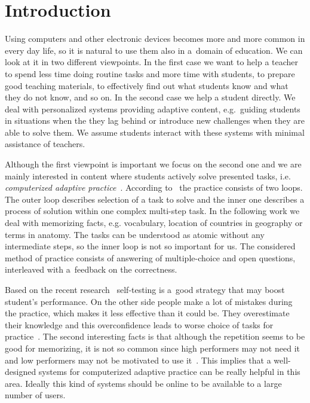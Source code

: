 \documentclass[table,color,cover,twoside,nolot,nolof]{fithesis3/fithesis3}
\begin{document}
\chapter{Introduction}

Using computers and other electronic devices becomes more and mo\-re common in
every day life, so it is natural to use them also in a~domain of education. We
can look at it in two different viewpoints. In the first case we want to help
a teacher to spend less time doing routine tasks and more time with students,
to prepare good teaching materials, to effectively find out what students
know and what they do not know, and so on. In the second case we help
a student directly. We deal with personalized systems providing adaptive
content, e.g.~guiding students in situations when the they lag behind
or introduce new challenges when they are able to solve them. We assume
students interact with these systems with minimal assistance of teachers.

Although the first viewpoint is important we focus on the second one and we are
mainly interested in content where students actively solve presented tasks,
i.e. \emph{computerized adaptive practice}~\cite{klinkenberg2011computer}.
According to~\cite{vanlehn2006behavior} the practice consists of two loops. The
outer loop describes selection of a task to solve and the inner one
describes a process of solution within one complex multi-step task. In the
following work we deal with memorizing facts, e.g. vocabulary, location of
countries in geography or terms in anatomy. The tasks can be understood as
atomic without any intermediate steps, so the inner loop is not so important
for us. The considered method of practice consists of answering of
multiple-choice and open questions, interleaved with a~feedback on the
correctness.

Based on the recent research~\cite{bjork2013self} self-testing is a~good
strategy that may boost student's performance. On the other side people make
a lot of mistakes during the practice, which makes it less effective than it
could be. They overestimate their knowledge and this overconfidence leads to
worse choice of tasks for practice~\cite{bjork2013self,kornell2008optimising}.
The second interesting facts is that although the repetition seems to be good
for memorizing, it is not so common since high performers may not need it and
low performers may not be motivated to use it~\cite{bjork2013self}. This
implies that a well-designed systems for computerized adaptive practice can be
really helpful in this area. Ideally this kind of systems should be online to
be available to a large number of users.
\end{document}
